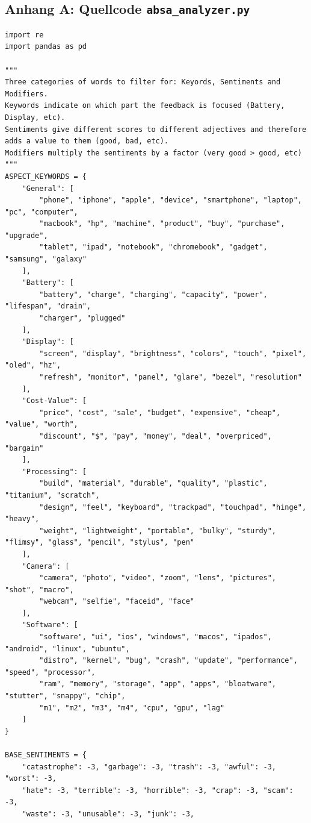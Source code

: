 \documentclass[12pt]{article}
\begin{document}
\subsection*{Anhang A: Quellcode \texttt{absa\_analyzer.py}}
\label{app:absa_analyzer}
\begin{lstlisting}
import re
import pandas as pd

"""
Three categories of words to filter for: Keyords, Sentiments and Modifiers.
Keywords indicate on which part the feedback is focused (Battery, Display, etc).
Sentiments give different scores to different adjectives and therefore adds a value to them (good, bad, etc).
Modifiers multiply the sentiments by a factor (very good > good, etc) 
"""
ASPECT_KEYWORDS = {
    "General": [
        "phone", "iphone", "apple", "device", "smartphone", "laptop", "pc", "computer", 
        "macbook", "hp", "machine", "product", "buy", "purchase", "upgrade", 
        "tablet", "ipad", "notebook", "chromebook", "gadget", "samsung", "galaxy"
    ],
    "Battery": [
        "battery", "charge", "charging", "capacity", "power", "lifespan", "drain", 
        "charger", "plugged"
    ],
    "Display": [
        "screen", "display", "brightness", "colors", "touch", "pixel", "oled", "hz", 
        "refresh", "monitor", "panel", "glare", "bezel", "resolution"
    ],
    "Cost-Value": [
        "price", "cost", "sale", "budget", "expensive", "cheap", "value", "worth", 
        "discount", "$", "pay", "money", "deal", "overpriced", "bargain"
    ],
    "Processing": [
        "build", "material", "durable", "quality", "plastic", "titanium", "scratch", 
        "design", "feel", "keyboard", "trackpad", "touchpad", "hinge", "heavy", 
        "weight", "lightweight", "portable", "bulky", "sturdy", "flimsy", "glass", "pencil", "stylus", "pen"
    ],
    "Camera": [
        "camera", "photo", "video", "zoom", "lens", "pictures", "shot", "macro", 
        "webcam", "selfie", "faceid", "face"
    ],
    "Software": [
        "software", "ui", "ios", "windows", "macos", "ipados", "android", "linux", "ubuntu", 
        "distro", "kernel", "bug", "crash", "update", "performance", "speed", "processor", 
        "ram", "memory", "storage", "app", "apps", "bloatware", "stutter", "snappy", "chip", 
        "m1", "m2", "m3", "m4", "cpu", "gpu", "lag"
    ]
}

BASE_SENTIMENTS = {
    "catastrophe": -3, "garbage": -3, "trash": -3, "awful": -3, "worst": -3, 
    "hate": -3, "terrible": -3, "horrible": -3, "crap": -3, "scam": -3, 
    "waste": -3, "unusable": -3, "junk": -3,
    

\end{lstlisting}
\end{document}
